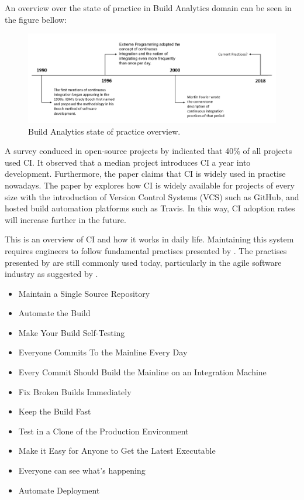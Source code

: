 \documentclass[]{book}
\providecommand{\tightlist}{%
  \setlength{\itemsep}{0pt}\setlength{\parskip}{0pt}}
\begin{document}
An overview over the state of practice in Build Analytics domain can be
seen in the figure bellow:

\begin{figure}
\centering
\includegraphics{figures/Chapter3/state_pr.png}
\caption{Build Analytics state of practice overview.}
\end{figure}

A survey conduced in open-source projects by \citet{hilton2016usage}
indicated that 40\% of all projects used CI. It observed that a median
project introduces CI a year into development. Furthermore, the paper
claims that CI is widely used in practise nowadays. The paper by
\citet{rausch2017empirical} explores how CI is widely available for
projects of every size with the introduction of Version Control Systems
(VCS) such as GitHub, and hosted build automation platforms such as
Travis. In this way, CI adoption rates will increase further in the
future.

This is an overview of CI and how it works in daily life. Maintaining
this system requires engineers to follow fundamental practises presented
by \citet{fowler2006continuous}. The practises presented by
\citet{fowler2006continuous} are still commonly used today, particularly
in the agile software industry as suggested by
\citet{stolberg2009enabling}.

\begin{itemize}
\tightlist
\item
  Maintain a Single Source Repository
\item
  Automate the Build
\item
  Make Your Build Self-Testing
\item
  Everyone Commits To the Mainline Every Day
\item
  Every Commit Should Build the Mainline on an Integration Machine
\item
  Fix Broken Builds Immediately
\item
  Keep the Build Fast
\item
  Test in a Clone of the Production Environment
\item
  Make it Easy for Anyone to Get the Latest Executable
\item
  Everyone can see what's happening
\item
  Automate Deployment
\end{itemize}
\end{document}

